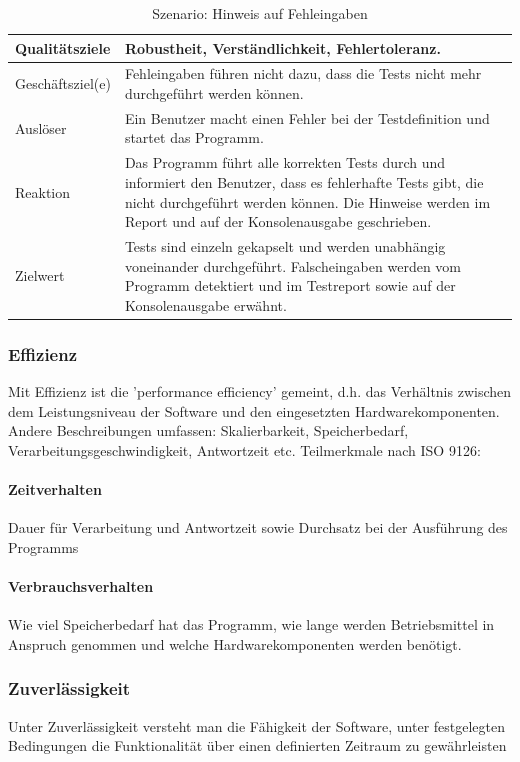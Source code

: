\documentclass[]{subfiles}
\begin{document}
		\begin{table}[!h]
			\begin{tabularx}{\textwidth}{lX}
				\toprule
				Qualitätsziele & Robustheit, Verständlichkeit, Fehlertoleranz.  \\
				\midrule
				Geschäftsziel(e) & Fehleingaben führen nicht dazu, dass die Tests nicht mehr durchgeführt werden können.  \\
				\midrule
				Auslöser & Ein Benutzer macht einen Fehler bei der Testdefinition und startet das Programm.  \\
				\midrule
				Reaktion & Das Programm führt alle korrekten Tests durch und informiert den Benutzer, dass es fehlerhafte Tests gibt, die nicht durchgeführt werden können. Die Hinweise werden im Report und auf der Konsolenausgabe geschrieben.   \\
				\midrule
				Zielwert & Tests sind einzeln gekapselt und werden unabhängig voneinander durchgeführt. Falscheingaben werden vom Programm detektiert und im Testreport sowie auf der Konsolenausgabe erwähnt.  \\
				\bottomrule
			\end{tabularx}
			\caption{Szenario: Hinweis auf Fehleingaben}
		\end{table}
		
		
	\subsubsection{Effizienz}
	Mit Effizienz ist die 'performance efficiency' gemeint, d.h. das Verhältnis zwischen dem Leistungsniveau der Software und den eingesetzten Hardwarekomponenten. 
	Andere Beschreibungen umfassen: Skalierbarkeit, Speicherbedarf, Verarbeitungsgeschwindigkeit, Antwortzeit etc.
	Teilmerkmale nach ISO 9126:

		\paragraph{Zeitverhalten}
		Dauer für Verarbeitung und Antwortzeit sowie Durchsatz bei der Ausführung des Programms

		\paragraph{Verbrauchsverhalten}
		Wie viel Speicherbedarf hat das Programm, wie lange werden Betriebsmittel in Anspruch genommen und welche Hardwarekomponenten werden benötigt.

	\subsubsection{Zuverlässigkeit}
	Unter Zuverlässigkeit versteht man die Fähigkeit der Software, unter festgelegten Bedingungen die Funktionalität über einen definierten Zeitraum zu gewährleisten
	
\end{document}
